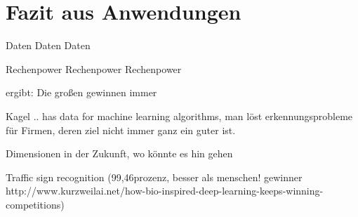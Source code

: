 
\section{Fazit aus Anwendungen}

Daten Daten Daten

Rechenpower Rechenpower Rechenpower

ergibt: Die großen gewinnen immer


Kagel .. has data for machine learning algorithms, man löst erkennungsprobleme für Firmen, deren ziel nicht immer ganz ein guter ist.


Dimensionen in der Zukunft, wo könnte es hin gehen

Traffic sign recognition (99,46prozenz, besser als menschen! gewinner http://www.kurzweilai.net/how-bio-inspired-deep-learning-keeps-winning-competitions)